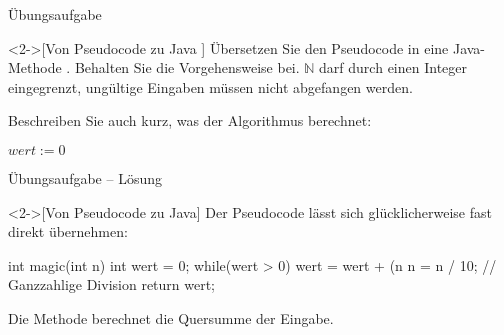 \begin{frame}[fragile,c]{Übungsaufgabe}
    \begin{exercise}<2->[Von Pseudocode zu Java ]
        \pause{}Übersetzen Sie den Pseudocode in eine Java-Methode . Behalten Sie die Vorgehensweise bei. \(\mathbb{N}\) darf durch einen Integer eingegrenzt, ungültige Eingaben müssen nicht abgefangen werden.\medskip\par\pause Beschreiben Sie auch kurz, was der Algorithmus berechnet:\par\pause
{}%
%
%
\SetAlgoVlined%
\begin{algorithm}[H]
\PreCode
{}
\StartCode
    \(wert := 0\)\;
    \;
\end{algorithm}
    \end{exercise}
\end{frame}

\begin{frame}[fragile,c]{Übungsaufgabe -- Lösung}
    \begin{solve}<2->[Von Pseudocode zu Java]
        \pause{}Der Pseudocode lässt sich glücklicherweise fast direkt übernehmen:
\begin{plainjava}
int magic(int n) {
    int wert = 0;
    while(wert > 0) {
        wert = wert + (n %
        n = n / 10; // Ganzzahlige Division
    }
    return wert;
}
\end{plainjava}
        \pause{}Die Methode berechnet die Quersumme der Eingabe.
    \end{solve}
\end{frame}

